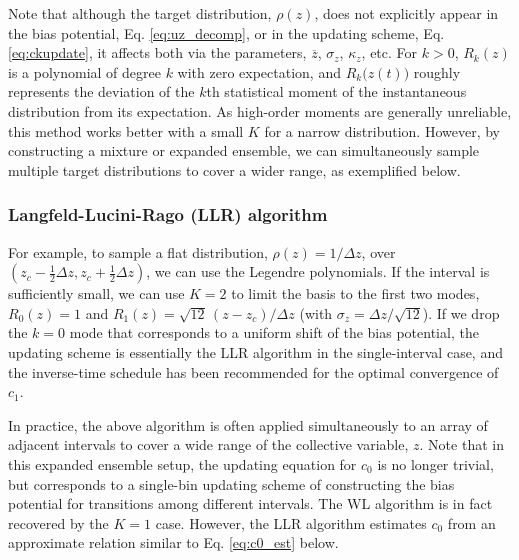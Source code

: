 \documentclass[preprint, superscriptaddress, floatfix]{revtex4-1}
\begin{document}
Note that although the target distribution, $\rho(z)$,
does not explicitly appear in the bias potential, Eq. \eqref{eq:uz_decomp},
or in the updating scheme, Eq. \eqref{eq:ckupdate},
it affects both via the parameters,
$\overline z$,
$\sigma_z$,
$\kappa_z$, etc.
%
For $k > 0$, $R_k(z)$ is a polynomial of degree $k$ with zero expectation,
%
and $R_k\bigl(z(t)\bigr)$ roughly
represents the deviation of the $k$th statistical moment
of the instantaneous distribution
from its expectation.
As high-order moments are generally unreliable,
this method works better with a small $K$ for a narrow distribution.
%
However, by constructing
a mixture or expanded ensemble\cite{swendsen1986,
  *geyer1991, *hukushima1996, *hansmann1997, *sugita1999,
  *earl2005, *zuckerman2011, *rauscher2009,
  neuhaus2006, *neuhaus2007, kim2010,
  marinari1992,
  *lyubartsev1992, li2007,
  park2007, *nguyen2013, *zhang2015st, shirts2017},
we can simultaneously sample multiple target distributions
to cover a wider range, as exemplified below.


\subsubsection{\label{sec:LLR}
Langfeld-Lucini-Rago (LLR) algorithm}

For example,
to sample a flat distribution, $\rho(z) = 1/\Delta z$,
over $\left(z_c - \frac 1 2 \Delta z, z_c + \frac 1 2 \Delta z\right)$,
we can use the Legendre polynomials\cite{arfken}.
%
If the interval is sufficiently small,
we can use $K = 2$ to limit the basis to the first two modes,
$R_0(z) = 1$ and $R_1(z) = \sqrt{12} \, (z - z_c)/\Delta z$
(with $\sigma_z = \Delta z/\sqrt{12}$).
%
If we drop the $k = 0$ mode
that corresponds to a uniform shift of the bias potential,
the updating scheme is essentially the LLR algorithm\cite{langfeld2012}
in the single-interval case,
and the inverse-time schedule
has been recommended for the optimal convergence of $c_1$.\cite{pellegrini2014}

In practice,
the above algorithm is often applied simultaneously
to an array of adjacent intervals
to cover a wide range of the collective variable, $z$.\cite{langfeld2012, pellegrini2014}
%
Note that in this expanded ensemble setup,
the updating equation for $c_0$ is no longer trivial,
but corresponds to a single-bin updating scheme of
constructing the bias potential for transitions among different intervals.
%
The WL algorithm is in fact recovered by the $K = 1$ case.
%
However, the LLR algorithm estimates $c_0$ from
an approximate relation similar to Eq. \eqref{eq:c0_est} below.
%
\end{document}
